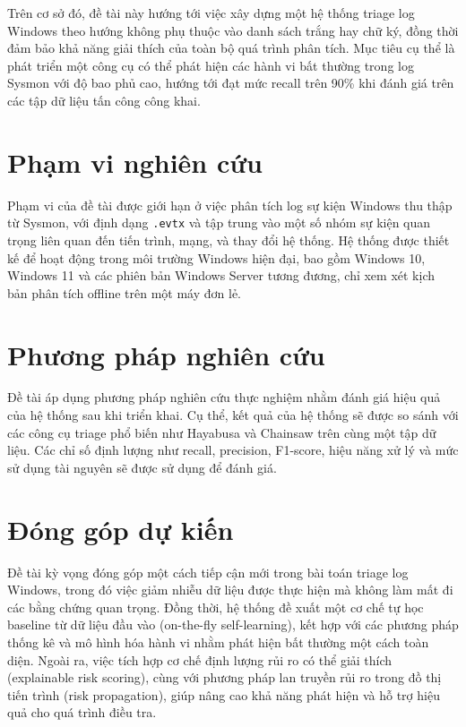\documentclass[../main.tex]{subfiles}
\begin{document}
Trên cơ sở đó, đề tài này hướng tới việc xây dựng một hệ thống triage log Windows theo hướng không phụ thuộc vào danh sách trắng hay chữ ký, đồng thời đảm bảo khả năng giải thích của toàn bộ quá trình phân tích. Mục tiêu cụ thể là phát triển một công cụ có thể phát hiện các hành vi bất thường trong log Sysmon với độ bao phủ cao, hướng tới đạt mức recall trên 90\% khi đánh giá trên các tập dữ liệu tấn công công khai.

\section*{Phạm vi nghiên cứu}

Phạm vi của đề tài được giới hạn ở việc phân tích log sự kiện Windows thu thập từ Sysmon, với định dạng \texttt{.evtx} và tập trung vào một số nhóm sự kiện quan trọng liên quan đến tiến trình, mạng, và thay đổi hệ thống. Hệ thống được thiết kế để hoạt động trong môi trường Windows hiện đại, bao gồm Windows 10, Windows 11 và các phiên bản Windows Server tương đương, chỉ xem xét kịch bản phân tích offline trên một máy đơn lẻ.

\section*{Phương pháp nghiên cứu}

Đề tài áp dụng phương pháp nghiên cứu thực nghiệm nhằm đánh giá hiệu quả của hệ thống sau khi triển khai. Cụ thể, kết quả của hệ thống sẽ được so sánh với các công cụ triage phổ biến như Hayabusa và Chainsaw trên cùng một tập dữ liệu. Các chỉ số định lượng như recall, precision, F1-score, hiệu năng xử lý và mức sử dụng tài nguyên sẽ được sử dụng để đánh giá.

\section*{Đóng góp dự kiến}

Đề tài kỳ vọng đóng góp một cách tiếp cận mới trong bài toán triage log Windows, trong đó việc giảm nhiễu dữ liệu được thực hiện mà không làm mất đi các bằng chứng quan trọng. Đồng thời, hệ thống đề xuất một cơ chế tự học baseline từ dữ liệu đầu vào (on-the-fly self-learning), kết hợp với các phương pháp thống kê và mô hình hóa hành vi nhằm phát hiện bất thường một cách toàn diện. Ngoài ra, việc tích hợp cơ chế định lượng rủi ro có thể giải thích (explainable risk scoring), cùng với phương pháp lan truyền rủi ro trong đồ thị tiến trình (risk propagation), giúp nâng cao khả năng phát hiện và hỗ trợ hiệu quả cho quá trình điều tra.
\end{document}

